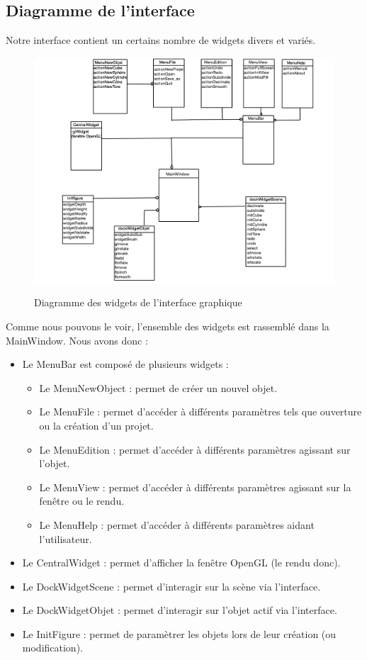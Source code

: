 \documentclass[a4paper]{memoir}
\begin{document}
			\subsection{Diagramme de l'interface}
				Notre interface contient un certains nombre de widgets divers et variés.
				\begin{figure}
					\hspace{-4cm}\includegraphics[scale=0.50]{img/diagramInterface.png}
					\label{fig:interface}
					\caption{Diagramme des widgets de l'interface graphique}
				\end{figure}
				Comme nous pouvons le voir, l'ensemble des widgets est rassemblé dans la MainWindow. Nous avons donc : 
				\begin{itemize}
					\item Le MenuBar est composé de plusieurs widgets : 
					\begin{itemize}
						\item Le MenuNewObject : permet de créer un nouvel objet.
						\item Le MenuFile : permet d'accéder à différents paramètres tels que ouverture ou la création d'un projet.
						\item Le MenuEdition : permet d'accéder à différents paramètres agissant sur l'objet.
						\item Le MenuView : permet d'accéder à différents paramètres agissant sur la fenêtre ou le rendu.
						\item Le MenuHelp : permet d'accéder à différents paramètres aidant l'utilisateur.
					\end{itemize}
					\item Le CentralWidget : permet d'afficher la fenêtre OpenGL (le rendu donc).
					\item Le DockWidgetScene : permet d'interagir sur la scène via l'interface.
					\item Le DockWidgetObjet : permet d'interagir sur l'objet actif via l'interface.
					\item Le InitFigure : permet de paramètrer les objets lors de leur création (ou modification).
				\end{itemize}
				
\end{document}
